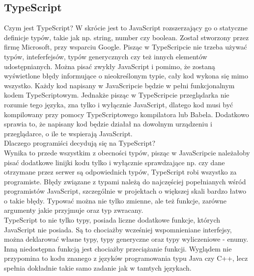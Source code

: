 \documentclass[12pt]{article}
\begin{document}
\begin{sloppypar}
{  \subsection{TypeScript}
  {
    Czym jest TypeScript? W skrócie jest to JavaScript rozszerzający go o statyczne definicje typów, takie jak np. string, number czy boolean. 
    Został stworzony przez firmę Microsoft, przy wsparciu Google.
    Pisząc w TypeScripcie nie trzeba używać typów, inteferfejsów, typów generycznych czy też innych elementów udostępnianych. 
    Można pisać zwykły JavaScript i pomimo, że zostaną wyświetlone błędy informujące o nieokreślonym typie, cały kod wykona się mimo wszystko.
    Każdy kod napisany w JavaScripcie będzie w pełni funkcjonalnym kodem TypeScriptowym.
    Jednakże pisząc w TypeScripcie przeglądarka nie rozumie tego języka, zna tylko i wyłącznie JavaScript, dlatego kod musi być kompilowany przy pomocy 
    TypeScriptowego kompilatora lub Babela.\cite{typescript-docs} 
    Dodatkowo sprawia to, że napisany kod będzie działał na dowolnym urządzeniu i przeglądarce, o ile te wspierają JavaScript.\\
    Dlaczego programiści decydują się na TypeScript?\\
    Wynika to przede wszystkim z obecności typów, pisząc w JavaScripcie należałoby pisać dodatkowe linijki kodu tylko i wyłącznie sprawdzające np. czy 
    dane otrzymane przez serwer są odpowiednich typów, TypeScript robi wszystko za programiste. 
    Błędy związane z typami należą do najczęściej popełnianych wśród programistów JavaScript, szczególnie w projektach o większej skali bardzo łatwo o takie błędy.
    Typować można nie tylko zmienne, ale też funkcje, zarówne argumenty jakie przyjmuje oraz typ zwracany.\\
    TypeScript to nie tylko typy, posiada liczne dodatkowe funkcje, których JavaScript nie posiada. Są to chociażby wcześniej wspomnieniane interfejsy, 
    można deklarować własne typy, typy generyczne oraz typy wyliczeniowe - enumy. Inną niedostępna funkcją jest chociażby przeciążanie funkcji. 
    Wyglądem nie przypomina to kodu znanego z języków programowania typu Java czy C++, lecz spełnia dokładnie takie samo zadanie jak w tamtych językach.
  }
}
\end{sloppypar}
\end{document}
